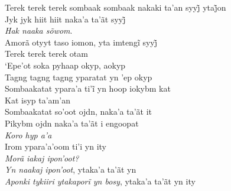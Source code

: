 \noindent   Terek terek terek sombaak sombaak nakaki ta’an syyj̃ ytaj̃on\\
  Jyk jyk hiit hiit naka’a ta’ãt syyj̃\\
  \textit{Hak naaka sõwom}.\\
  Amorã otyyt taso iomon, yta imtengĩ syyj̃\\
  Terek terek terek otam\\
  `Epe'ot soka pyhaap okyp, aokyp\\
  Tagng tagng tagng yparatat yn 'ep okyp\\
  Sombaakatat ypara’a ti’ĩ yn hoop iokybm kat\\
  Kat isyp ta'am'an\\
  Sombaakatat so'oot ojdn, naka'a ta'ãt it\\
  Pikybm ojdn naka'a ta'ãt i engoopat\\
  \textit{Koro hyp a'a}\\
  Irom ypara'a'oom ti'i yn ity\\
  \textit{Morã iakaj ipon'oot?}\\
  \textit{Yn naakaj ipon'oot}, ytaka'a ta'ãt yn\\
  \textit{Aponki tykiiri ytakaporĩ yn bosy}, ytaka’a ta’ãt yn ity\\
